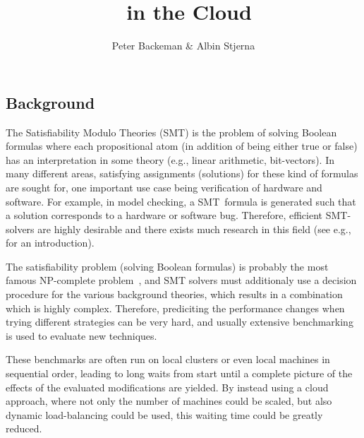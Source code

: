 \documentclass{article}
\title{\uppsat\ in the Cloud}
\author{Peter Backeman \& Albin Stjerna}
\begin{document}
\maketitle

\begin{multicols}{2}

  


\section*{Background}



The Satisfiability Modulo Theories (SMT) is the problem of solving
Boolean formulas where each propositional atom (in addition of being
either true or false) has an interpretation in some theory (e.g.,
linear arithmetic, bit-vectors). In many different areas, satisfying
assignments (solutions) for these kind of formulas are sought for, one
important use case being verification of hardware and software. For
example, in model checking, a SMT~formula is generated such that a
solution corresponds to a hardware or software bug. Therefore,
efficient SMT-solvers are highly desirable and there exists much
research in this field (see e.g.,~\cite{sathandbook} for an
introduction).

The satisfiability problem (solving Boolean formulas) is probably the
most famous NP-complete problem~\cite{satnp}, and SMT solvers must
additionaly use a decision procedure for the various background
theories, which results in a combination which is highly
complex. Therefore, prediciting the performance changes when trying
different strategies can be very hard, and usually extensive
benchmarking is used to evaluate new techniques.

These benchmarks are often run on local clusters or even local
machines in sequential order, leading to long waits from start until a
complete picture of the effects of the evaluated modifications are
yielded. By instead using a cloud approach, where not only the number
of machines could be scaled, but also dynamic load-balancing could be
used, this waiting time could be greatly reduced.


\end{multicols}
\end{document}
